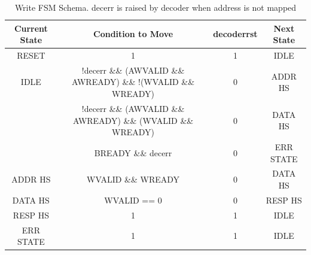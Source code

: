 \begin{table} [!h]
  \centering
  \begin{tabular} {c | c | c | c}
    Current State	& Condition to Move &	decoderrst & Next State \\
    \hline
    \hline
    RESET &	1	& 1	& IDLE \\
    \hline
    IDLE & \small {!decerr \&\& (AWVALID \&\& AWREADY) \&\& !(WVALID \&\& WREADY)} &	0	& ADDR HS \\
    & \small{!decerr \&\& (AWVALID \&\& AWREADY) \&\& (WVALID \&\& WREADY)} &	0	& DATA HS \\
    & BREADY \&\& decerr &	0 &	ERR STATE \\
    \hline
    ADDR HS	& WVALID \&\& WREADY &	0	& DATA HS \\
    \hline
    DATA HS	& WVALID == 0 &	0 &	RESP HS \\
    \hline
    RESP HS	& 1 &	1	& IDLE \\
    \hline
    ERR STATE &	1	& 1 &	IDLE \\
    \hline
  \end{tabular}
  \caption{Write FSM Schema. decerr is raised by decoder when address is not mapped}
  \label{writeFSMSchemaTab}
\end{table}
